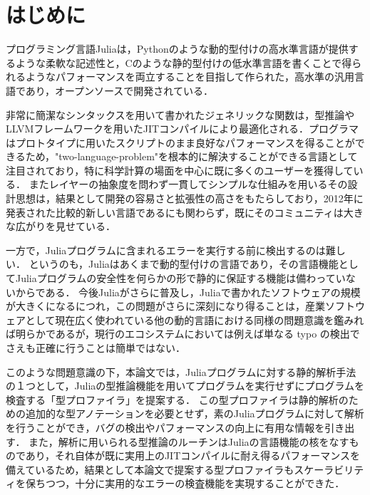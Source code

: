 
\section{はじめに}

プログラミング言語Juliaは，Pythonのような動的型付けの高水準言語が提供するような柔軟な記述性と，Cのような静的型付けの低水準言語を書くことで得られるようなパフォーマンスを両立することを目指して作られた，高水準の汎用言語であり，オープンソースで開発されている．

非常に簡潔なシンタックスを用いて書かれたジェネリックな関数は，型推論やLLVMフレームワークを用いたJITコンパイルにより最適化される．プログラマはプロトタイプに用いたスクリプトのまま良好なパフォーマンスを得ることができるため，"two-language-problem"\footnotemark を根本的に解決することができる言語として注目されており，特に科学計算の場面を中心に既に多くのユーザーを獲得している．
またレイヤーの抽象度を問わず一貫してシンプルな仕組みを用いるその設計思想は，結果として開発の容易さと拡張性の高さをもたらしており，2012年に発表された比較的新しい言語であるにも関わらず，既にそのコミュニティは大きな広がりを見せている．


一方で，Juliaプログラムに含まれるエラーを実行する前に検出するのは難しい．
というのも，Juliaはあくまで動的型付けの言語であり，その言語機能としてJuliaプログラムの安全性を何らかの形で静的に保証する機能は備わっていないからである．
今後Juliaがさらに普及し，Juliaで書かれたソフトウェアの規模が大きくになるにつれ，この問題がさらに深刻になり得ることは，産業ソフトウェアとして現在広く使われている他の動的言語における同様の問題意識を鑑みれば明らかであるが，現行のエコシステムにおいては例えば単なる typo の検出でさえも正確に行うことは簡単ではない．

このような問題意識の下，本論文では，Juliaプログラムに対する静的解析手法の１つとして，Juliaの型推論機能を用いてプログラムを実行せずにプログラムを検査する「型プロファイラ」を提案する．
この型プロファイラは静的解析のための追加的な型アノテーションを必要とせず，素のJuliaプログラムに対して解析を行うことができ，バグの検出やパフォーマンスの向上に有用な情報を引き出す．
また，解析に用いられる型推論のルーチンはJuliaの言語機能の核をなすものであり，それ自体が既に実用上のJITコンパイルに耐え得るパフォーマンスを備えているため，結果として本論文で提案する型プロファイラもスケーラビリティを保ちつつ，十分に実用的なエラーの検査機能を実現することができた．

